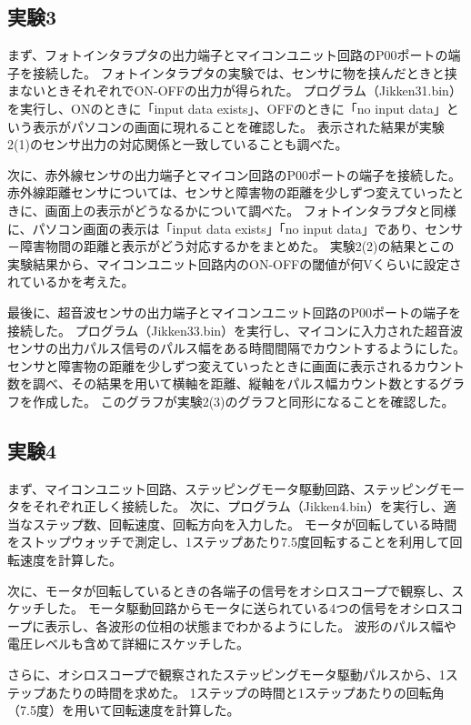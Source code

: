 \documentclass[../../../main]{subfiles}
\begin{document}
\subsection{実験3}
まず、フォトインタラプタの出力端子とマイコンユニット回路のP00ポートの端子を接続した。
フォトインタラプタの実験では、センサに物を挟んだときと挟まないときそれぞれでON-OFFの出力が得られた。
プログラム（Jikken31.bin）を実行し、ONのときに「input data exists」、OFFのときに「no input data」という表示がパソコンの画面に現れることを確認した。
表示された結果が実験2(1)のセンサ出力の対応関係と一致していることも調べた。

次に、赤外線センサの出力端子とマイコン回路のP00ポートの端子を接続した。
赤外線距離センサについては、センサと障害物の距離を少しずつ変えていったときに、画面上の表示がどうなるかについて調べた。
フォトインタラプタと同様に、パソコン画面の表示は「input data exists」「no input data」であり、センサ－障害物間の距離と表示がどう対応するかをまとめた。
実験2(2)の結果とこの実験結果から、マイコンユニット回路内のON-OFFの閾値が何Vくらいに設定されているかを考えた。

最後に、超音波センサの出力端子とマイコンユニット回路のP00ポートの端子を接続した。
プログラム（Jikken33.bin）を実行し、マイコンに入力された超音波センサの出力パルス信号のパルス幅をある時間間隔でカウントするようにした。
センサと障害物の距離を少しずつ変えていったときに画面に表示されるカウント数を調べ、その結果を用いて横軸を距離、縦軸をパルス幅カウント数とするグラフを作成した。
このグラフが実験2(3)のグラフと同形になることを確認した。

\subsection{実験4}
まず、マイコンユニット回路、ステッピングモータ駆動回路、ステッピングモータをそれぞれ正しく接続した。
次に、プログラム（Jikken4.bin）を実行し、適当なステップ数、回転速度、回転方向を入力した。
モータが回転している時間をストップウォッチで測定し、1ステップあたり7.5度回転することを利用して回転速度を計算した。

次に、モータが回転しているときの各端子の信号をオシロスコープで観察し、スケッチした。
モータ駆動回路からモータに送られている4つの信号をオシロスコープに表示し、各波形の位相の状態までわかるようにした。
波形のパルス幅や電圧レベルも含めて詳細にスケッチした。

さらに、オシロスコープで観察されたステッピングモータ駆動パルスから、1ステップあたりの時間を求めた。
1ステップの時間と1ステップあたりの回転角（7.5度）を用いて回転速度を計算した。
\end{document}
